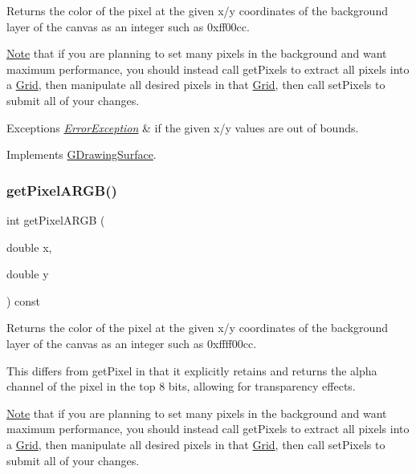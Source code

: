 Returns the color of the pixel at the given x/y coordinates of the background layer of the canvas as an integer such as 0xff00cc. 

\mbox{\hyperlink{classNote}{Note}} that if you are planning to set many pixels in the background and want maximum performance, you should instead call get\+Pixels to extract all pixels into a \mbox{\hyperlink{classGrid}{Grid}}, then manipulate all desired pixels in that \mbox{\hyperlink{classGrid}{Grid}}, then call set\+Pixels to submit all of your changes.


\begin{DoxyExceptions}{Exceptions}
{\em \mbox{\hyperlink{classErrorException}{Error\+Exception}}} & if the given x/y values are out of bounds. \\
\hline
\end{DoxyExceptions}


Implements \mbox{\hyperlink{classGDrawingSurface_a40f3e3f64a8263e13b7162e15b2979ee}{G\+Drawing\+Surface}}.

\mbox{\label{classGCanvas_ac1016456426446714a53d29da622f2ec}} 
\subsubsection{\texorpdfstring{get\+Pixel\+A\+R\+G\+B()}{getPixelARGB()}}
{\footnotesize\ttfamily int get\+Pixel\+A\+R\+GB (\begin{DoxyParamCaption}\item[{double}]{x,  }\item[{double}]{y }\end{DoxyParamCaption}) const\hspace{0.3cm}{\ttfamily [virtual]}}



Returns the color of the pixel at the given x/y coordinates of the background layer of the canvas as an integer such as 0xffff00cc. 

This differs from get\+Pixel in that it explicitly retains and returns the alpha channel of the pixel in the top 8 bits, allowing for transparency effects.

\mbox{\hyperlink{classNote}{Note}} that if you are planning to set many pixels in the background and want maximum performance, you should instead call get\+Pixels to extract all pixels into a \mbox{\hyperlink{classGrid}{Grid}}, then manipulate all desired pixels in that \mbox{\hyperlink{classGrid}{Grid}}, then call set\+Pixels to submit all of your changes.


